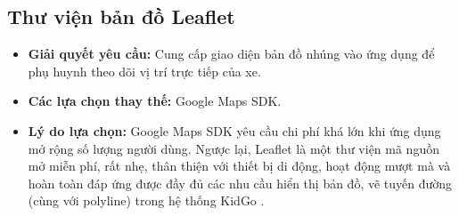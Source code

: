 \documentclass[../DoAn.tex]{subfiles}
\begin{document}
\subsection{Thư viện bản đồ Leaflet}
\begin{itemize}
    \item \textbf{Giải quyết yêu cầu:} Cung cấp giao diện bản đồ nhúng vào ứng dụng để phụ huynh theo dõi vị trí trực tiếp của xe.
    \item \textbf{Các lựa chọn thay thế:} Google Maps SDK.
    \item \textbf{Lý do lựa chọn:} Google Maps SDK yêu cầu chi phí khá lớn khi ứng dụng mở rộng số lượng người dùng. Ngược lại, Leaflet là một thư viện mã nguồn mở miễn phí, rất nhẹ, thân thiện với thiết bị di động, hoạt động mượt mà và hoàn toàn đáp ứng được đầy đủ các nhu cầu hiển thị bản đồ, vẽ tuyến đường (cùng với polyline) trong hệ thống KidGo \cite{Leaflet_Reference}.
\end{itemize}
\end{document}
